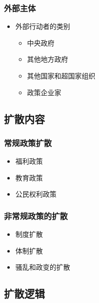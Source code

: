 \documentclass[
  12pt,
]{ctexart}
\begin{document}
\hypertarget{ux5916ux90e8ux4e3bux4f53}{%
\subsubsection{外部主体}\label{ux5916ux90e8ux4e3bux4f53}}

\begin{itemize}
\item
  外部行动者的类别

  \begin{itemize}
  \item
    中央政府
  \item
    其他地方政府
  \item
    其他国家和超国家组织
  \item
    政策企业家
  \end{itemize}
\end{itemize}

\hypertarget{ux6269ux6563ux5185ux5bb9}{%
\subsection{扩散内容}\label{ux6269ux6563ux5185ux5bb9}}

\hypertarget{ux5e38ux89c4ux653fux7b56ux6269ux6563}{%
\subsubsection{常规政策扩散}\label{ux5e38ux89c4ux653fux7b56ux6269ux6563}}

\begin{itemize}
\item
  福利政策
\item
  教育政策
\item
  公民权利政策
\end{itemize}

\hypertarget{ux975eux5e38ux89c4ux653fux7b56ux7684ux6269ux6563}{%
\subsubsection{非常规政策的扩散}\label{ux975eux5e38ux89c4ux653fux7b56ux7684ux6269ux6563}}

\begin{itemize}
\item
  制度扩散
\item
  体制扩散
\item
  骚乱和政变的扩散
\end{itemize}

\hypertarget{ux6269ux6563ux903bux8f91}{%
\subsection{扩散逻辑}\label{ux6269ux6563ux903bux8f91}}
\end{document}
